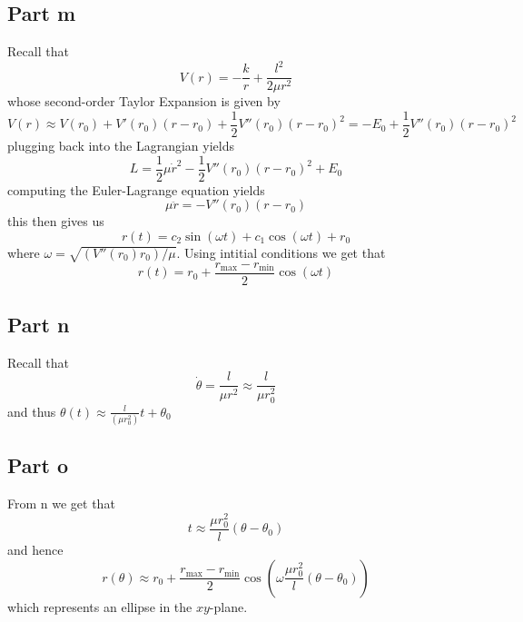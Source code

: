 \documentclass[12pt]{report}
\begin{document}
\subsection*{Part m}
Recall that 
\begin{equation*}
    V(r) = -\frac{k}{r} + \frac{l^2}{2\mu r^2} 
\end{equation*}
whose second-order Taylor Expansion is given by
\begin{equation*}
    V(r) \approx V(r_0) + V'(r_0) (r-r_0) + \frac{1}{2} V''(r_0)(r-r_0)^2 = -E_0 + \frac{1}{2}V''(r_0)(r-r_0)^2
\end{equation*}
plugging back into the Lagrangian yields
\begin{equation*}
    L = \frac{1}{2}\mu \dot{r}^2 - \frac{1}{2}V''(r_0)(r-r_0)^2 + E_0
\end{equation*}
computing the Euler-Lagrange equation yields
\begin{equation*}
    \mu \ddot{r} = -V''(r_0)(r-r_0)
\end{equation*}
this then gives us
\begin{equation*}
    r(t) = c_2 \sin\left(\omega t\right) + c_1\cos(\omega t) + r_0
\end{equation*}
where $\omega = \sqrt{(V''(r_0)r_0)/\mu}$. Using intitial conditions we get that
\begin{equation*}
    r(t) = r_0 + \frac{r_\text{max} - r_{\text{min}}}{2}\cos(\omega t)
\end{equation*}

\subsection*{Part n}
Recall that
\begin{equation*}
    \dot{\theta} = \frac{l}{\mu r^2} \approx \frac{l}{\mu r_0^2}
\end{equation*}
and thus $\theta(t) \approx \frac{l}{(\mu r_0^2)}t + \theta_0$

\subsection*{Part o}
From n we get that
\begin{equation*}
    t \approx \frac{\mu r_0^2}{l}(\theta - \theta_0)
\end{equation*}
and hence
\begin{equation*}
    r(\theta) \approx r_0 + \frac{r_\text{max} - r_{\text{min}}}{2}\cos\left(\omega\frac{\mu r_0^2}{l}(\theta - \theta_0) \right)
\end{equation*}
which represents an ellipse in the $xy$-plane.
\end{document}
